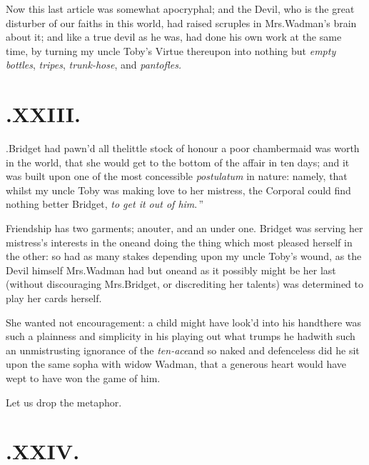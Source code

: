 \documentclass{article}
\begin{document}
Now this last article was somewhat apocryphal; and the Devil,
who is the great disturber of our faiths in this world, had raised
scruples in Mrs.\@ Wadman’s brain about it; and like a
true devil as he was, had done his own work at the same time, by
turning my uncle Toby’s Virtue thereupon into nothing
but \textit{empty bottles}, \textit{tripes}, \textit{trunk-hose}, and
\textit{pantofles.}

\vfill{}\eject
\null{}\baselineskip
\section{.\enspace XXIII.}

.\@ Bridget had pawn’d
all the\break little stock of honour a poor chambermaid was worth in the
world, that she would get to the bottom of the affair in ten days;
and it was built upon one of the most concessible \textit{postulatum}
in nature: namely, that whilst my uncle Toby was making love
to her mistress, the Corporal could find nothing better\break 
{}
Bridget, \lqq \textit{to get it out of him}.\,”

Friendship has two garments; an\break outer, and an under one.
Bridget was serving her mistress’s interests in the
one\tsk and doing the thing which most pleased herself in the
other: so had as many stakes depending upon my uncle
Toby’s wound, as the Devil himself\tsh 
Mrs.\@ Wadman had but one\tsk and as it possibly might be her
last (without discouraging Mrs.\@ Bridget, or discrediting her
talents) was determined to play her cards herself.

She wanted not encouragement: a child might have look’d
into his hand\break\tsh there was such a plainness and
simplicity in his playing out what trumps he had\tsh with
such an unmistrusting ignorance of the
\textit{ten-ace}\tsh and so naked and defenceless did he sit
upon the same sopha with widow Wadman, that a generous heart
would have wept to have won the game of him.

Let us drop the metaphor.

\vfill{}\eject
\null{}\baselineskip
\section{.\enspace XXIV.}
\end{document}
